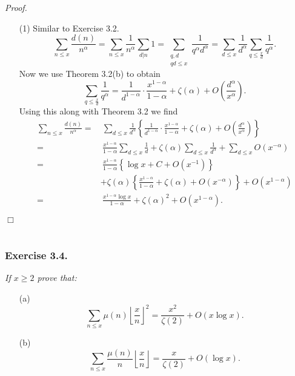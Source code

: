 \documentclass{article}
\begin{document}
\emph{Proof.}
\begin{enumerate}
\item[(1)]
  Similar to Exercise 3.2.
  \[
    \sum_{n \leq x} \frac{d(n)}{n^{\alpha}}
    = \sum_{n \leq x} \frac{1}{n^{\alpha}} \sum_{d|n} 1
    = \sum_{\substack{q,d \\ qd \leq x}} \frac{1}{q^{\alpha}d^{\alpha}}
    = \sum_{d \leq x} \frac{1}{d^{\alpha}} \sum_{q \leq \frac{x}{d}} \frac{1}{q^{\alpha}}.
  \]
  Now we use Theorem 3.2(b) to obtain
  \[
    \sum_{q \leq \frac{x}{d}} \frac{1}{q^{\alpha}}
    = \frac{1}{d^{1-\alpha}} \cdot \frac{x^{1-\alpha}}{1-\alpha} + \zeta(\alpha)
        + O\left(\frac{d^{\alpha}}{x^{\alpha}}\right).
  \]
  Using this along with Theorem 3.2 we find
  \begin{align*}
    \sum_{n \leq x} \frac{d(n)}{n^{\alpha}}
    =& \: \sum_{d \leq x}
        \frac{1}{d^{\alpha}} \left\{ \frac{1}{d^{1-\alpha}} \cdot \frac{x^{1-\alpha}}{1-\alpha}
            + \zeta(\alpha)
            + O\left(\frac{d^{\alpha}}{x^{\alpha}}\right) \right\} \\
    =& \: \frac{x^{1-\alpha}}{1-\alpha} \sum_{d \leq x} \frac{1}{d}
        + \zeta(\alpha) \sum_{d \leq x} \frac{1}{d^{\alpha}}
        + \sum_{d \leq x} O(x^{-\alpha}) \\
    =& \: \frac{x^{1-\alpha}}{1-\alpha} \left\{ \log x + C + O(x^{-1}) \right\} \\
      & + \zeta(\alpha)
          \left\{ \frac{x^{1-\alpha}}{1-\alpha} + \zeta(\alpha) + O(x^{-\alpha}) \right\}
          + O(x^{1-\alpha}) \\
    =& \: \frac{x^{1-\alpha} \log x}{1 - \alpha} + \zeta(\alpha)^2 + O(x^{1-\alpha}).
  \end{align*}
\end{enumerate}
$\Box$ \\\\






\subsubsection*{Exercise 3.4.}
\emph{If $x \geq 2$ prove that:}
\begin{enumerate}
\item[(a)]
  \[
    \sum_{n \leq x} \mu(n) \left\lfloor \frac{x}{n} \right\rfloor^2
    = \frac{x^2}{\zeta(2)} + O(x \log x).
  \]

\item[(b)]
  \[
    \sum_{n \leq x} \frac{\mu(n)}{n} \left\lfloor \frac{x}{n} \right\rfloor
    = \frac{x}{\zeta(2)} + O(\log x).
  \] \\
\end{enumerate}
\end{document}

